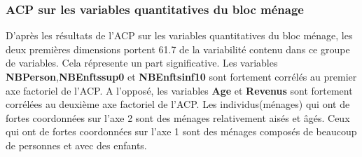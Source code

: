 \documentclass[11pt,a4paper, x11names]{article}\usepackage[]{graphicx}\usepackage[]{color}
\makeatletter
\newenvironment{kframe}{%
 \def\at@end@of@kframe{}%
 \ifinner\ifhmode%
  \def\at@end@of@kframe{\end{minipage}}%
  \begin{minipage}{\columnwidth}%
 \fi\fi%
 \def\FrameCommand##1{\hskip\@totalleftmargin \hskip-\fboxsep
 \colorbox{shadecolor}{##1}\hskip-\fboxsep
     \hskip-\linewidth \hskip-\@totalleftmargin \hskip\columnwidth}%
 \MakeFramed {\advance\hsize-\width
   \@totalleftmargin\z@ \linewidth\hsize
   \@setminipage}}%
 {\par\unskip\endMakeFramed%
 \at@end@of@kframe}
\newenvironment{knitrout}{}{} %
\makeatother
\begin{document}
\subsubsection{ACP sur les variables quantitatives du bloc ménage}
\begin{minipage}{0.49\linewidth}
\begin{mdframed}
\begin{knitrout}
\color{fgcolor}\begin{kframe}


{\ttfamily\noindent\bfseries\color{errorcolor}{\#\# Error in .get\_facto\_class(X): objet 'res.pca\_menage' introuvable}}\end{kframe}
\end{knitrout}
\end{mdframed}
\end{minipage}
\hfill
\begin{minipage}{0.49\linewidth}
\begin{mdframed}
\begin{knitrout}
\color{fgcolor}\begin{kframe}


{\ttfamily\noindent\bfseries\color{errorcolor}{\#\# Error in .get\_facto\_class(X): objet 'res.pca\_menage' introuvable}}\end{kframe}
\end{knitrout}
\end{mdframed}
\end{minipage}

D'après les résultats de l'ACP sur les variables quantitatives du bloc ménage,
les deux premières dimensions portent 61.7 de la variabilité contenu dans ce groupe de variables. Cela répresente un part significative. Les variables \textbf{NBPerson},\textbf{NBEnftssup0} et \textbf{NBEnftsinf10} sont fortement corrélés au premier axe factoriel de l'ACP. A l'opposé, les variables  \textbf{Age} et \textbf{Revenus} sont fortement corrélées au deuxième axe factoriel de l'ACP. Les individus(ménages) qui ont de fortes coordonnées sur l'axe 2 sont des ménages relativement aisés et âgés. Ceux qui ont de fortes coordonnées sur l'axe 1 sont des ménages composés de beaucoup de personnes et avec des enfants.
\end{document}
